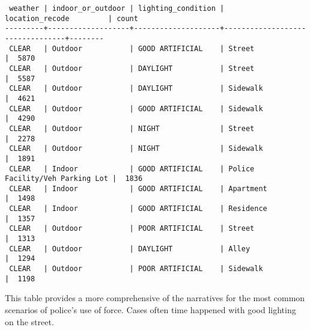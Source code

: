 \documentclass[10pt]{article}
\begin{document}
\begin{verbatim}
 weather | indoor_or_outdoor | lighting_condition |         location_recode         | count
---------+-------------------+--------------------+---------------------------------+--------
 CLEAR   | Outdoor           | GOOD ARTIFICIAL    | Street                          |  5870
 CLEAR   | Outdoor           | DAYLIGHT           | Street                          |  5587
 CLEAR   | Outdoor           | DAYLIGHT           | Sidewalk                        |  4621
 CLEAR   | Outdoor           | GOOD ARTIFICIAL    | Sidewalk                        |  4290
 CLEAR   | Outdoor           | NIGHT              | Street                          |  2278
 CLEAR   | Outdoor           | NIGHT              | Sidewalk                        |  1891
 CLEAR   | Indoor            | GOOD ARTIFICIAL    | Police Facility/Veh Parking Lot |  1836
 CLEAR   | Indoor            | GOOD ARTIFICIAL    | Apartment                       |  1498
 CLEAR   | Indoor            | GOOD ARTIFICIAL    | Residence                       |  1357
 CLEAR   | Outdoor           | POOR ARTIFICIAL    | Street                          |  1313
 CLEAR   | Outdoor           | DAYLIGHT           | Alley                           |  1294
 CLEAR   | Outdoor           | POOR ARTIFICIAL    | Sidewalk                        |  1198
\end{verbatim}

This table provides a more comprehensive of the narratives for the most common scenarios of police's use of force. Cases often time happened with good lighting on the street.
\end{document}
